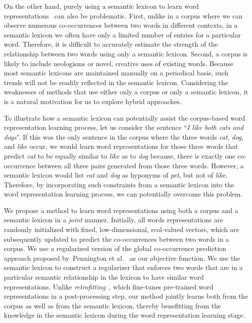 \documentclass[letterpaper]{article}
\begin{document}
On the other hand, purely using a semantic lexicon to learn word representations~\cite{Bollegala:AAAI:2015} can also be problematic.
First, unlike in a corpus where we can observe numerous co-occurrences between two words in different contexts,
in a semantic lexicon we often have only a limited number of entries for a  particular word.
Therefore, it is difficult to accurately estimate the strength of the relationship between two words using only a semantic lexicon.
Second, a corpus is likely to include neologisms or novel, creative uses of existing words.
Because most semantic lexicons are maintained manually on a periodical basis, such trends will not be readily reflected in the semantic lexicon.
Considering the weaknesses of methods that use either only a corpus or only a semantic lexicon, it is a natural motivation for us to
explore hybrid approaches.

To illustrate how a semantic lexicon can potentially assist the corpus-based word representation learning process,
let us consider the sentence ``\emph{I like both cats and dogs}''.
If this was the only sentence in the corpus where the three words \emph{cat}, \emph{dog}, and \emph{like} occur,
we would learn word representations for those three words
that predict \emph{cat} to be equally similar to \emph{like} as to \emph{dog} because,
there is exactly one co-occurrence between all three pairs generated from those three words.
However, a semantic lexicon would list \emph{cat} and \emph{dog} as hyponyms of \emph{pet}, but not of \emph{like}.
Therefore, by incorporating such constraints from a semantic lexicon
 into the word representation learning process, we can potentially overcome this problem.

We propose a method to learn word representations using both a corpus and a semantic lexicon in a \emph{joint} manner.
Initially, all words representations are randomly initialized with fixed, low-dimensional, real-valued vectors, which are subsequently updated to
predict the co-occurrences between two words in a corpus.
We use a regularized version of the global co-occurrence prediction approach proposed
by~Pennington et al.~ as our objective function.
We use the semantic lexicon to construct a regularizer that enforces two words that are in a particular semantic relationship in the lexicon
to have similar word representations.
Unlike \emph{retrofitting}~\cite{faruqui-EtAl:2015:NAACL-HLT},
which fine-tunes pre-trained word representations in a post-processing step, our method
jointly learns both from the corpus as well as from the semantic lexicon, thereby benefitting from the knowledge in the
semantic lexicon during the word representation learning stage.
\end{document}
